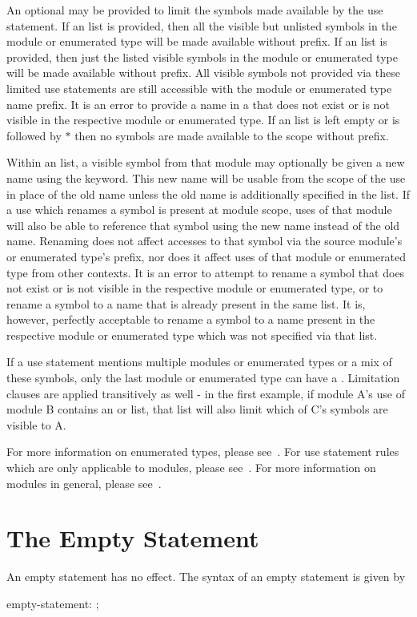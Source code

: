 
An optional  may be provided to limit the symbols made
available by the use statement.  If an  list is provided, then all
the visible but unlisted symbols in the module or enumerated type will be made
available without prefix.  If an  list is provided, then just the
listed visible symbols in the module or enumerated type will be made available
without prefix.  All visible symbols not provided via these limited use
statements are still accessible with the module or enumerated type name prefix.
It is an error to provide a name in a  that does not
exist or is not visible in the respective module or enumerated type.  If an
 list is left empty or  is followed by $*$ then no
symbols are made available to the scope without prefix.

Within an  list, a visible symbol from that module may optionally be
given a new name using the  keyword.  This new name will be usable from
the scope of the use in place of the old name unless the old name is
additionally specified in the  list.  If a use which renames a symbol
is present at module scope, uses of that module will also be able to reference
that symbol using the new name instead of the old name.  Renaming does not
affect accesses to that symbol via the source module's or enumerated type's
prefix, nor does it affect uses of that module or enumerated type from other
contexts.  It is an error to attempt to rename a symbol that does not exist or
is not visible in the respective module or enumerated type, or to rename a
symbol to a name that is already present in the same  list.  It is,
however, perfectly acceptable to rename a symbol to a name present in the
respective module or enumerated type which was not specified via
that  list.

If a use statement mentions multiple modules or enumerated types or a mix of
these symbols, only the last module or enumerated type can have a
.  Limitation clauses are applied transitively as well
- in the first example, if module A's use of module B contains an 
or  list, that list will also limit which of C's symbols are visible
to A.

For more information on enumerated types, please see~.
For use statement rules which are only applicable to modules, please
see~.  For more information on modules in general, please
see~.


\section{The Empty Statement}
\label{The_Empty_Statement}

An empty statement has no effect.  The syntax of an empty statement is
given by
\begin{syntax}
empty-statement:
  ;
\end{syntax}

